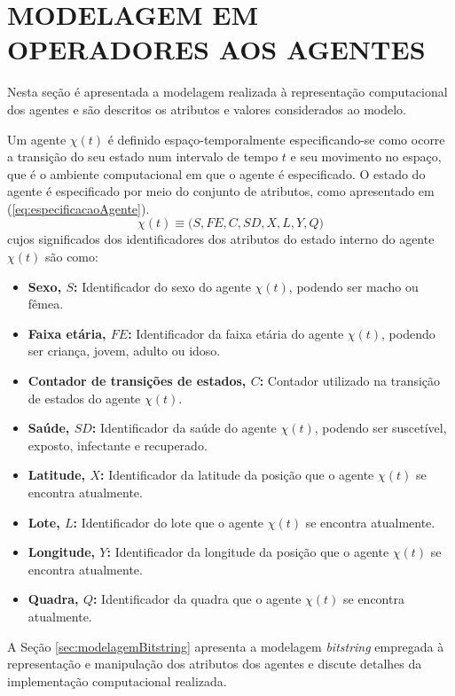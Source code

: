 \section{MODELAGEM EM OPERADORES AOS AGENTES}
\label{sec:modelagemAgentes}

Nesta seção é apresentada a modelagem realizada à representação computacional dos agentes e são descritos os atributos e valores considerados ao modelo.

Um agente $\chi(t)$ é definido espaço-temporalmente especificando-se como ocorre a transição do seu estado num intervalo de tempo $t$ e seu movimento no espaço, que é o ambiente computacional em que o agente é especificado. O estado do agente é especificado por meio do conjunto de atributos, como apresentado em (\ref{eq:especificacaoAgente}).
\begin{equation}
\label{eq:especificacaoAgente}
 \chi(t) \equiv \big(S, FE, C, SD, X, L, Y, Q \big)
\end{equation}
cujos significados dos identificadores dos atributos do estado interno do agente $\chi(t)$ são como:

\begin{itemize}
 \item \textbf{Sexo, $S$:} Identificador do sexo do agente $\chi(t)$, podendo ser macho ou fêmea.
 \item \textbf{Faixa etária, $FE$:} Identificador da faixa etária do agente $\chi(t)$, podendo ser criança, jovem, adulto ou idoso.
 \item \textbf{Contador de transições de estados, $C$:} Contador utilizado na transição de estados do agente $\chi(t)$.
 \item \textbf{Saúde, $SD$:} Identificador da saúde do agente $\chi(t)$, podendo ser suscetível, exposto, infectante e recuperado.
 \item \textbf{Latitude, $X$:} Identificador da latitude da posição que o agente $\chi(t)$ se encontra atualmente.
 \item \textbf{Lote, $L$:} Identificador do lote que o agente $\chi(t)$ se encontra atualmente.
 \item \textbf{Longitude, $Y$:} Identificador da longitude da posição que o agente $\chi(t)$ se encontra atualmente.
 \item \textbf{Quadra, $Q$:} Identificador da quadra que o agente $\chi(t)$ se encontra atualmente.
\end{itemize}

A Seção \ref{sec:modelagemBitstring} apresenta a modelagem \textit{bitstring} empregada à representação e manipulação dos atributos dos agentes e discute detalhes da implementação computacional realizada.

\newpage